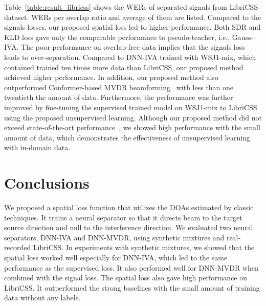 \documentclass[a4paper]{article}
\begin{document}
Table~\ref{table:result_libricss} shows the WERs of separated signals from LibriCSS dataset.
WERs per overlap ratio and average of them are listed.
Compared to the signals losses, our proposed spatial loss led to higher performance.
Both SDR and KLD loss gave only the comparable performance to pseudo-teacher, i.e., Gauss-IVA.
The poor performance on overlap-free data implies that the signals loss leads to over-separation.
Compared to DNN-IVA trained with WSJ1-mix, which contained trained ten times more data than LibriCSS, our proposed method achieved higher performance.
In addition, our proposed method also outperformed Conformer-based MVDR beamforming~\cite{libricss_conformer} with less than one twentieth the amount of data.
Furthermore, the performance was further improved by fine-tuning the supervised trained model on WSJ1-mix to LibriCSS using the proposed unsupervised learning.
Although our proposed method did not exceed state-of-the-art performance~\cite{libricss_sota}, we showed high performance with the small amount of data, which demonstrates the effectiveness of unsupervised learning with in-domain data.


\section{Conclusions}
We proposed a spatial loss function that utilizes the DOAs estimated by classic techniques.
It trains a neural separator so that it directs beam to the target source direction and null to the interference direction.
We evaluated two neural separators, DNN-IVA and DNN-MVDR, using synthetic mixtures and real-recorded LibriCSS.
In experiments with synthetic mixtures, we showed that the spatial loss worked well especially for DNN-IVA, which led to the same performance as the supervised loss.
It also performed well for DNN-MVDR when combined with the signal loss.
The spatial loss also gave high performance on LibriCSS.
It outperformed the strong baselines with the small amount of training data without any labels.




\pagebreak




\end{document}
